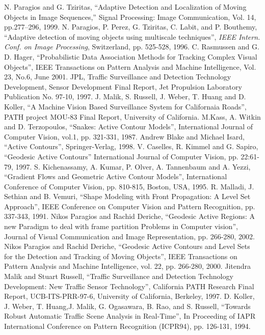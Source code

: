 \begin{thebibliography}{200}
 N. Paragios and G. Tziritas, ``Adaptive Detection and Localization of Moving Objects in Image Sequences,'' Signal Processing: Image Communication, Vol. 14, pp.277--296, 1999.
 N. Paragios, P. Perez, G. Tziritas, C. Labit, and P. Bouthemy, “Adaptive detection of moving objects using multiscale techniques”, \textit{IEEE Intern. Conf. on Image Processing}, Switzerland, pp. 525-528, 1996.
 C. Rasmussen and G. D. Hager, ``Probabilistic Data Association Methods for Tracking Complex Visual Objects'', IEEE Transactions on Pattern Analysis and Machine Intelligence, Vol. 23, No.6, June
2001.
 JPL, Traffic Surveillance and Detection Technology Development, Sensor Development Final Report, Jet Propulsion Laboratory Publication No. 97-10, 1997.
 J. Malik, S. Russell, J. Weber, T. Huang and D. Koller, ``A Machine Vision Based Surveillance System for Californaia Roads'', PATH project MOU-83 Final Report, University of California.
 M.Kass, A. Witkin and D. Terzopoulos, ``Snakes: Active Contour Models'', International Journal of Computer Vision, vol.1, pp. 321-331, 1987.
 Andrew Blake and Michael Isard, “Active Contours”, Springer-Verlag, 1998.
 V. Caselles, R. Kimmel and G. Sapiro, “Geodesic Active Contours” International Journal of Computer Vision, pp. 22:61-79, 1997.
 S. Kichenassamy, A. Kumar, P. Olver, A. Tannenbaum and A. Yezzi, ``Gradient Flows and Geometric Active Contour Models”, International Conference of Computer Vision, pp. 810-815, Boston, USA, 1995.
 R. Malladi, J. Sethian and B. Vemuri, “Shape Modeling with Front Propagation: A Level Set Approach”, IEEE Conference on Computer Vision and Pattern Recognition, pp. 337-343, 1991.
 Nikos Paragios and Rachid Deriche, “Geodesic Active Regions: A new Paradigm to deal with frame partition Problems in Computer vision”, Journal of Visual Communication and Image Representation, pp. 266-280, 2002.
 Nikos Paragios and Rachid Deriche, “Geodesic Active Contours and Level Sets for the Detection and Tracking of Moving Objects”, IEEE Transactions on Pattern Analysis and Machine Intelligence, vol. 22, pp. 266-280, 2000.
 Jitendra Malik and Stuart Russell, ``Traffic Surveillance and Detection Technology Development: New Traffic Sensor Technology”, California PATH Research Final Report, UCB-ITS-PRR-97-6, University of California, Berkeley, 1997.
 D. Koller, J. Weber, T. Huang,J. Malik, G. Ogasawara, B. Rao, and S. Russell, ``Towards Robust Automatic Traffic Scene Analysis in Real-Time'', In Proceeding of IAPR International Conference on Pattern Recognition (ICPR94), pp. 126-131, 1994.

\end{thebibliography}
